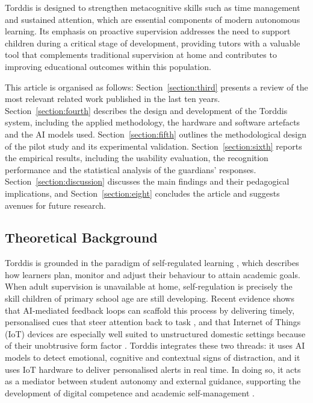 		Torddis is designed to strengthen metacognitive skills such as time management and sustained attention, which are essential components of modern autonomous learning. Its emphasis on proactive supervision addresses the need to support children during a critical stage of development, providing tutors with a valuable tool that complements traditional supervision at home and contributes to improving educational outcomes within this population.
		
		This article is organised as follows: Section~\ref{section:third} presents a review of the most relevant related work published in the last ten years. Section~\ref{section:fourth} describes the design and development of the Torddis system, including the applied methodology, the hardware and software artefacts and the AI models used. Section~\ref{section:fifth} outlines the methodological design of the pilot study and its experimental validation. Section~\ref{section:sixth} reports the empirical results, including the usability evaluation, the recognition performance and the statistical analysis of the guardians' responses. Section~\ref{section:discussion} discusses the main findings and their pedagogical implications, and Section~\ref{section:eight} concludes the article and suggests avenues for future research.
				
	\subsection{Theoretical Background}
\label{sec:theoretical-background}
    Torddis is grounded in the paradigm of self-regulated learning \citep{Zimmerman2000Attaining, Panadero2017Review}, which describes how learners plan, monitor and adjust their behaviour to attain academic goals. When adult supervision is unavailable at home, self-regulation is precisely the skill children of primary school age are still developing. Recent evidence shows that AI-mediated feedback loops can scaffold this process by delivering timely, personalised cues that steer attention back to task \citep{Wang2025Development, Li2024Systematic}, and that Internet of Things (IoT) devices are especially well suited to unstructured domestic settings because of their unobtrusive form factor \citep{Ackermans2025Young}. Torddis integrates these two threads: it uses AI models to detect emotional, cognitive and contextual signs of distraction, and it uses IoT hardware to deliver personalised alerts in real time. In doing so, it acts as a mediator between student autonomy and external guidance, supporting the development of digital competence and academic self-management \citep{Loh2025Plugging, Mohamed2018Implementing, Echeverria2011AFramework}.

